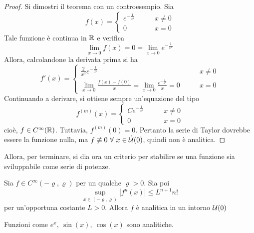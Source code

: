 \begin{proof}
 Si dimostri il teorema con un controesempio. Sia 
 \begin{equation}
     f(x)= \begin{cases}
         e^{-\frac{1}{x^2}} &\qquad x \neq 0\\
         0 &\qquad x=0
     \end{cases}
 \end{equation}
 Tale funzione è continua in $\mathbb{R}$ e verifica 
 \begin{equation}
     \lim_{x \to 0}{f(x)}=0= \lim_{x \to 0}{ e ^{-\frac{1}{x^2}}}
 \end{equation}
 Allora, calcolandone la derivata prima si ha 
 \begin{equation}
     f'(x)= \begin{cases}
         \frac{2}{x^3} e^{-\tfrac{1}{x^2}} & \qquad x \neq 0\\
         \lim\limits_{x \to 0}{\frac{f(x)-f(0)}{x}}= \lim\limits_{x \to 0}{\frac{e^{-\frac{1}{x^2}}}{x}}=0 &\qquad x=0
     \end{cases}
 \end{equation}
 Continuando a derivare, si ottiene sempre un'equazione del tipo
 \begin{equation}
     f^{(m)}(x)=\begin{cases}
         C e^{-\frac{1}{x^2}} &\qquad x\neq0\\
         0 &\qquad x=0
     \end{cases}
 \end{equation}
 cioè, $f \in C^\infty(\mathbb{R})$. Tuttavia, $f^{(m)}(0)=0$. Pertanto la serie di Taylor dovrebbe essere la funzione nulla, ma $f \not\equiv 0\ \forall\ x \in \dot{\mathcal{U}}(0)$, quindi non è analitica.
\end{proof}
Allora, per terminare, si dia ora un criterio per stabilire se una funzione sia sviluppabile come serie di potenze.
\begin{theorem} \label{Teo: Criterio di sviluppabilità}
    Sia $f \in C^\infty(-\varrho, \varrho)$ per un qualche $\varrho>0$. Sia poi
    \begin{equation}
        \sup_{x \in (-\varrho, \varrho)}{|f^{n}(x)|}\leq L^{n+1}n!
    \end{equation}
    per un'opportuna costante $L>0$. Allora $f$ è analitica in un intorno $\mathcal{U}(0)$
\end{theorem}
\begin{oss}
    Funzioni come $e^x,\ \sin(x), \ \cos(x)$ sono analitiche.
\end{oss}
